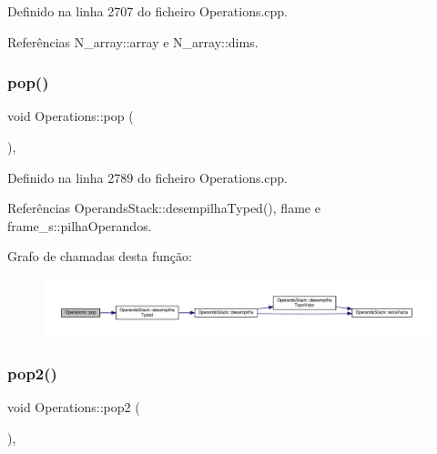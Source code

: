Definido na linha 2707 do ficheiro Operations.\+cpp.



Referências N\+\_\+array\+::array e N\+\_\+array\+::dims.

\mbox{\label{classOperations_a30b8a646cbfac3712f4b339364bd31b1}} 
\subsubsection{\texorpdfstring{pop()}{pop()}}
{\footnotesize\ttfamily void Operations\+::pop (\begin{DoxyParamCaption}{ }\end{DoxyParamCaption})\hspace{0.3cm}{\ttfamily [static]}, {\ttfamily [private]}}



Definido na linha 2789 do ficheiro Operations.\+cpp.



Referências Operands\+Stack\+::desempilha\+Typed(), flame e frame\+\_\+s\+::pilha\+Operandos.

Grafo de chamadas desta função\+:
\nopagebreak
\begin{figure}[H]
\begin{center}
\leavevmode
\includegraphics[width=350pt]{classOperations_a30b8a646cbfac3712f4b339364bd31b1_cgraph}
\end{center}
\end{figure}
\mbox{\label{classOperations_a54e578f7f27df39f8c516ec93195e219}} 
\subsubsection{\texorpdfstring{pop2()}{pop2()}}
{\footnotesize\ttfamily void Operations\+::pop2 (\begin{DoxyParamCaption}{ }\end{DoxyParamCaption})\hspace{0.3cm}{\ttfamily [static]}, {\ttfamily [private]}}



